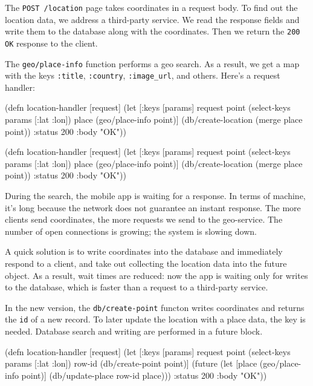 The \verb|POST /location| page takes coordinates in a request body. To find out the location data, we address a third-party service. We read the response fields and write them to the database along with the coordinates. Then we return the \verb|200 OK| response to the client.

The \verb|geo/place-info| function performs a geo search.
As a result, we get a map with the keys \verb|:title|, \verb|:country|, \verb|:image_url|, and others.
Here's a request handler:

\ifx\DEVICETYPE\MOBILE

\begin{clojure}
(defn location-handler [request]
  (let [{:keys [params]} request
        point (select-keys params
                [:lat :lon])
        place (geo/place-info point)]
    (db/create-location
      (merge place point))
    {:status 200 :body "OK"}))
\end{clojure}

\else

\begin{clojure}
(defn location-handler [request]
  (let [{:keys [params]} request
        point (select-keys params [:lat :lon])
        place (geo/place-info point)]
    (db/create-location (merge place point))
    {:status 200 :body "OK"}))
\end{clojure}

\fi

During the search, the mobile app is waiting for a response. In terms of
machine, it's long because the network does not guarantee an instant response.
The more clients send coordinates, the more requests we send to the geo-service.
The number of open connections is growing; the system is slowing down.


A quick solution is to write coordinates into the database and immediately
respond to a client, and take out collecting the location data into the future
object. As a result, wait times are reduced: now the app is waiting only for
writes to the database, which is faster than a request to a third-party service.

In the new version, the \verb|db/create-point| functon writes coordinates and
returns the \verb|id| of a new record. To later update the location with a place
data, the key is needed. Database search and writing are performed in a future
block.

\ifx\DEVICETYPE\MOBILE

\begin{clojure}
(defn location-handler
  [request]
  (let [{:keys [params]} request
        point (select-keys params
                [:lat :lon])
        row-id (db/create-point point)]
    (future
      (let [place (geo/place-info
                    point)]
        (db/update-place row-id place)))
    {:status 200 :body "OK"}))
\end{clojure}

